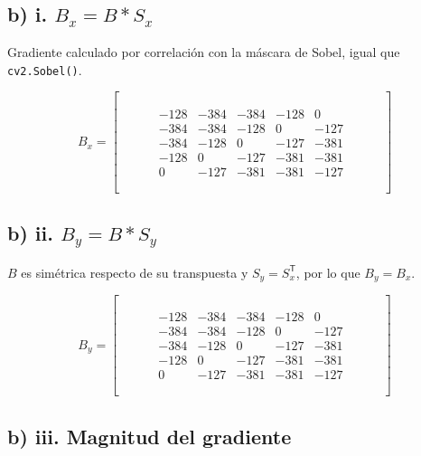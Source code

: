 \documentclass[12pt, a4paper]{article}
\newcommand{\vacia}{\phantom{0000}}
\begin{document}
\subsection{b) i. $B_x = B * S_x$}

Gradiente calculado por correlación con la máscara de Sobel, igual que \texttt{cv2.Sobel()}.

\[
B_x =
\begin{bmatrix}
\vacia & \vacia & \vacia & \vacia & \vacia & \vacia & \vacia \\
\vacia & -128 & -384 & -384 & -128 & 0 & \vacia \\
\vacia & -384 & -384 & -128 & 0 & -127 & \vacia \\
\vacia & -384 & -128 & 0 & -127 & -381 & \vacia \\
\vacia & -128 & 0 & -127 & -381 & -381 & \vacia \\
\vacia & 0 & -127 & -381 & -381 & -127 & \vacia \\
\vacia & \vacia & \vacia & \vacia & \vacia & \vacia & \vacia
\end{bmatrix}
\]

\subsection{b) ii. $B_y = B * S_y$}

$B$ es simétrica respecto de su transpuesta y $S_y = S_x^{\mathsf{T}}$, por lo que $B_y = B_x$.

\[
B_y =
\begin{bmatrix}
\vacia & \vacia & \vacia & \vacia & \vacia & \vacia & \vacia \\
\vacia & -128 & -384 & -384 & -128 & 0 & \vacia \\
\vacia & -384 & -384 & -128 & 0 & -127 & \vacia \\
\vacia & -384 & -128 & 0 & -127 & -381 & \vacia \\
\vacia & -128 & 0 & -127 & -381 & -381 & \vacia \\
\vacia & 0 & -127 & -381 & -381 & -127 & \vacia \\
\vacia & \vacia & \vacia & \vacia & \vacia & \vacia & \vacia
\end{bmatrix}
\]

\subsection{b) iii. Magnitud del gradiente}
\end{document}
